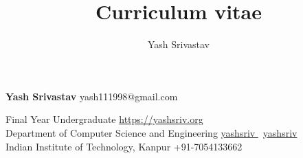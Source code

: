 \documentclass[9pt]{extarticle}
\title{Curriculum vitae}
\author{Yash Srivastav}
\begin{document}

\begingroup
{}

{\Huge\textbf{\sc Yash Srivastav}}
\hfill
yash111998@gmail.com \faEnvelope


Final Year Undergraduate
\hfill
\href{https://yashsriv.org}{https://yashsriv.org \faHome}\\

Department of Computer Science and Engineering
\hfill
\href{https://github.com/yashsriv}{yashsriv \faGithub} \textbar \ 
\href{https://www.linkedin.com/in/yashsriv/}{yashsriv \faLinkedin} \\

Indian Institute of Technology, Kanpur
\hfill
+91-7054133662 \faMobile \\

\begin{minipage}[t]{0.49\textwidth}
  \vspace{3mm}
  
  
  
\end{minipage}
\hfill
\begin{minipage}[t]{0.49\textwidth}
  \vspace{3mm}
  
  
  
\end{minipage}


\endgroup
\end{document}

